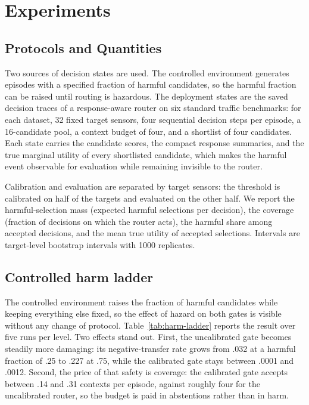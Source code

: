 \section{Experiments}
\label{sec:experiments}

\subsection{Protocols and Quantities}

Two sources of decision states are used. The controlled environment generates
episodes with a specified fraction of harmful candidates, so the harmful
fraction can be raised until routing is hazardous. The deployment states are
the saved decision traces of a response-aware router on six standard traffic
benchmarks: for each dataset, 32 fixed target sensors, four sequential
decision steps per episode, a 16-candidate pool, a context budget of four, and
a shortlist of four candidates. Each state carries the candidate scores, the
compact response summaries, and the true marginal utility of every
shortlisted candidate, which makes the harmful event observable for
evaluation while remaining invisible to the router.

Calibration and evaluation are separated by target sensors: the threshold is
calibrated on half of the targets and evaluated on the other half. We report
the harmful-selection mass (expected harmful selections per decision), the
coverage (fraction of decisions on which the router acts), the harmful share
among accepted decisions, and the mean true utility of accepted selections.
Intervals are target-level bootstrap intervals with 1000 replicates.

\subsection{Controlled harm ladder}

The controlled environment raises the fraction of harmful candidates while
keeping everything else fixed, so the effect of hazard on both gates is
visible without any change of protocol. Table~\ref{tab:harm-ladder} reports the
result over five runs per level. Two effects stand out. First, the
uncalibrated gate becomes steadily more damaging: its negative-transfer rate
grows from .032 at a harmful fraction of .25 to .227 at .75, while the
calibrated gate stays between .0001 and .0012. Second, the price of that safety
is coverage: the calibrated gate accepts between .14 and .31 contexts per
episode, against roughly four for the uncalibrated router, so the budget is
paid in abstentions rather than in harm.

